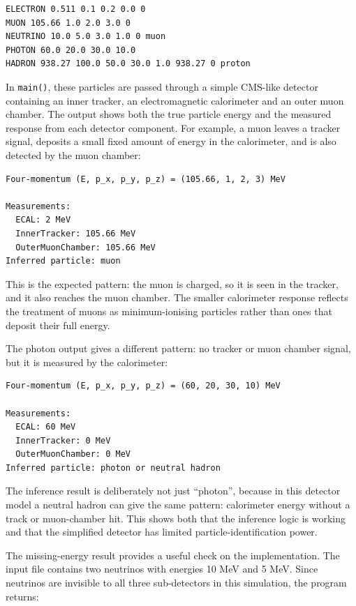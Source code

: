 \documentclass[11pt,a4paper]{article}
\begin{document}
\begin{lstlisting}[caption={Extract from \texttt{particles.txt}.}, label={lst:particleinput}]
ELECTRON 0.511 0.1 0.2 0.0 0
MUON 105.66 1.0 2.0 3.0 0
NEUTRINO 10.0 5.0 3.0 1.0 0 muon
PHOTON 60.0 20.0 30.0 10.0
HADRON 938.27 100.0 50.0 30.0 1.0 938.27 0 proton
\end{lstlisting}

In \texttt{main()}, these particles are passed through a simple CMS-like detector containing an inner tracker, an electromagnetic calorimeter and an outer muon chamber. The output shows both the true particle energy and the measured response from each detector component. For example, a muon leaves a tracker signal, deposits a small fixed amount of energy in the calorimeter, and is also detected by the muon chamber:

\begin{lstlisting}[caption={Example detector output for a muon.}, label={lst:muonoutput}]
Four-momentum (E, p_x, p_y, p_z) = (105.66, 1, 2, 3) MeV

Measurements:
  ECAL: 2 MeV
  InnerTracker: 105.66 MeV
  OuterMuonChamber: 105.66 MeV
Inferred particle: muon
\end{lstlisting}

This is the expected pattern: the muon is charged, so it is seen in the tracker, and it also reaches the muon chamber. The smaller calorimeter response reflects the treatment of muons as minimum-ionising particles rather than ones that deposit their full energy.

The photon output gives a different pattern: no tracker or muon chamber signal, but it is measured by the calorimeter:

\begin{lstlisting}[caption={Example detector output for a photon.}, label={lst:photonoutput}]
Four-momentum (E, p_x, p_y, p_z) = (60, 20, 30, 10) MeV

Measurements:
  ECAL: 60 MeV
  InnerTracker: 0 MeV
  OuterMuonChamber: 0 MeV
Inferred particle: photon or neutral hadron
\end{lstlisting}

The inference result is deliberately not just ``photon'', because in this detector model a neutral hadron can give the same pattern: calorimeter energy without a track or muon-chamber hit. This shows both that the inference logic is working and that the simplified detector has limited particle-identification power.

The missing-energy result provides a useful check on the implementation. The input file contains two neutrinos with energies 10 MeV and 5 MeV. Since neutrinos are invisible to all three sub-detectors in this simulation, the program returns:
\end{document}
